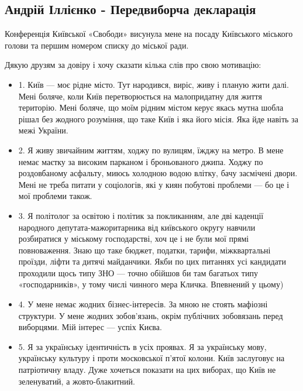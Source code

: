  
 

\subsection{Андрій Іллієнко - Передвиборча декларація}

Конференція Київської «Свободи» висунула мене на посаду Київського міського
голови та першим номером списку до міської ради.

Дякую друзям за довіру і хочу сказати кілька слів про свою мотивацію:

\begin{itemize}
	
\item 1. Київ — моє рідне місто. Тут народився, виріс, живу і планую жити далі. Мені
боляче, коли Київ перетворюється на малопридатну для життя територію. Мені
боляче, що моїм рідним містом керує якась мутна шобла рішал без жодного
розуміння, що таке Київ і яка його місія. Яка йде навіть за межі України. 

\item 2. Я живу звичайним життям, ходжу по вулицям, їжджу на метро. В мене немає
маєтку за високим парканом і броньованого джипа. Ходжу по роздовбаному
асфальту, миюсь холодною водою влітку, бачу засмічені двори. Мені не треба
питати у соціологів, які у киян побутові проблеми — бо це і мої проблеми також. 

\item 3. Я політолог за освітою і політик за покликанням, але дві каденції народного
депутата-мажоритарника від київського округу навчили розбиратися у міському
господарстві, хоч це і не були мої прямі повноваження. Знаю що таке бюджет,
податки, тарифи, міжквартальні проїзди, ліфти та дитячі майданчики. Якби по цих
питаннях усі кандидати проходили щось типу ЗНО — точно обійшов би там багатьох
типу «господарників», у тому числі чинного мера Кличка. Впевнений у цьому)

\item 4. У мене немає жодних бізнес-інтересів. За мною не стоять мафіозні структури.
У мене жодних зобов’язань, окрім публічних зобовязань перед виборцями. Мій
інтерес — успіх Києва. 

\item 5. Я за українську ідентичність в усіх проявах. Я за українську мову,
українську культуру і проти московської п’ятої колони. Київ заслуговує на
патріотичну владу. Дуже хочеться показати на цих виборах, що Київ не
зеленуватий, а жовто-блакитний.


\end{itemize}
